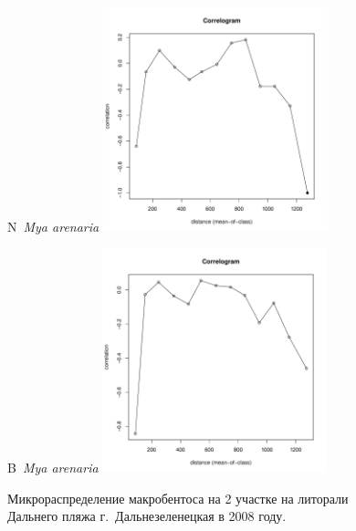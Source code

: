 \documentclass[12pt, a4paper]{disser}
\begin{document}
\begin{figure}[h]
	\begin{minipage}[b]{.46\linewidth}
	\begin{center}
	{\small N~{\it Mya arenaria}}
		\includegraphics[width=65mm]{../Barenc_Sea/distribution_Moran/Plyazh082_moran_N_Mya_arenaria_.pdf}
	\end{center}
	\end{minipage}
%
	\hfil %
%
	\begin{minipage}[b]{.46\linewidth}
	\begin{center}
	{\small B~{\it Mya arenaria}}
		\includegraphics[width=65mm]{../Barenc_Sea/distribution_Moran/Plyazh082_moran_B_Mya_arenaria_.pdf}
	\end{center}
	\end{minipage}



	\caption{Микрораспределение макробентоса на 2 участке на литорали Дальнего пляжа г.~Дальнезеленецкая в 2008 году.}
	\label{ris:moransI_Plyazh082_1}
	\end{figure}
\end{document}
